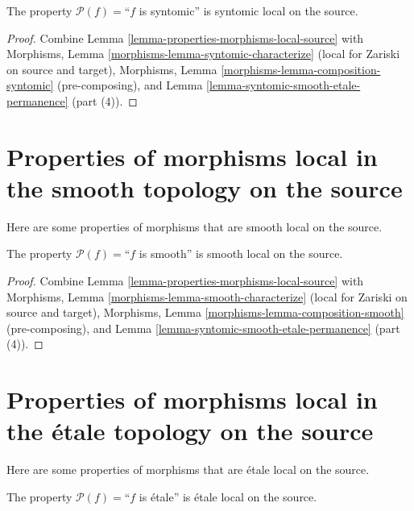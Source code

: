 \begin{lemma}
\label{lemma-syntomic-syntomic-local-source}
The property $\mathcal{P}(f)=$``$f$ is syntomic''
is syntomic local on the source.
\end{lemma}

\begin{proof}
Combine Lemma \ref{lemma-properties-morphisms-local-source} with
Morphisms, Lemma \ref{morphisms-lemma-syntomic-characterize}
(local for Zariski on source and target),
Morphisms, Lemma \ref{morphisms-lemma-composition-syntomic} (pre-composing),
and Lemma \ref{lemma-syntomic-smooth-etale-permanence} (part (4)).
\end{proof}




\section{Properties of morphisms local in the smooth topology on the source}
\label{section-smooth-local-source}

\noindent
Here are some properties of morphisms that are smooth local on the source.

\begin{lemma}
\label{lemma-smooth-smooth-local-source}
The property $\mathcal{P}(f)=$``$f$ is smooth''
is smooth local on the source.
\end{lemma}

\begin{proof}
Combine Lemma \ref{lemma-properties-morphisms-local-source} with
Morphisms, Lemma \ref{morphisms-lemma-smooth-characterize}
(local for Zariski on source and target),
Morphisms, Lemma \ref{morphisms-lemma-composition-smooth} (pre-composing), and
Lemma \ref{lemma-syntomic-smooth-etale-permanence} (part (4)).
\end{proof}



\section{Properties of morphisms local in the \'etale topology on the source}
\label{section-etale-local-source}

\noindent
Here are some properties of morphisms that are \'etale local on the source.

\begin{lemma}
\label{lemma-etale-etale-local-source}
The property $\mathcal{P}(f)=$``$f$ is \'etale''
is \'etale local on the source.
\end{lemma}

